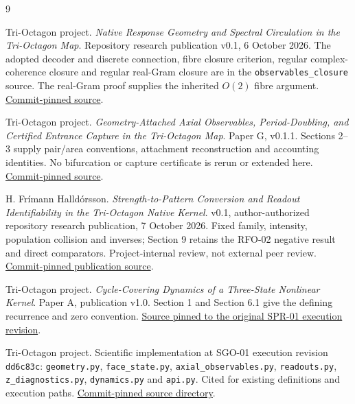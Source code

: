 \documentclass[11pt,a4paper]{article}
\begin{document}
\clearpage
\begin{thebibliography}{9}\raggedright
{}
Tri-Octagon project. \emph{Native Response Geometry and Spectral Circulation in the Tri-Octagon Map}. Repository research publication v0.1, 6 October 2026. The adopted decoder and discrete connection, fibre closure criterion, regular complex-coherence closure and regular real-Gram closure are in the \texttt{observables\_closure} source. The real-Gram proof supplies the inherited $O(2)$ fibre argument. \href{https://github.com/pzychozen/trioctagon-physics/blob/dd6c83cbf5bab228ea4fa4c2b90384d8b70f9772/papers/NATIVE_RESPONSE_GEOMETRY/manuscript/observables_closure.tex}{Commit-pinned source}.

Tri-Octagon project. \emph{Geometry-Attached Axial Observables, Period-Doubling, and Certified Entrance Capture in the Tri-Octagon Map}. Paper G, v0.1.1. Sections 2--3 supply pair/area conventions, attachment reconstruction and accounting identities. No bifurcation or capture certificate is rerun or extended here. \href{https://github.com/pzychozen/trioctagon-physics/blob/dd6c83cbf5bab228ea4fa4c2b90384d8b70f9772/papers/PAPER_G/v0.1.1/source/paper_g.tex}{Commit-pinned source}.

H. Fr\'imann Halld\'orsson. \emph{Strength-to-Pattern Conversion and Readout Identifiability in the Tri-Octagon Native Kernel}. v0.1, author-authorized repository research publication, 7 October 2026. Fixed family, intensity, population collision and inverses; Section 9 retains the RFO-02 negative result and direct comparators. Project-internal review, not external peer review. \href{https://github.com/pzychozen/trioctagon-physics/blob/dd6c83cbf5bab228ea4fa4c2b90384d8b70f9772/papers/STRENGTH_PATTERN_IDENTIFIABILITY/v0.1/source/SPR01_STRENGTH_PATTERN_IDENTIFIABILITY_v0.1.tex}{Commit-pinned publication source}.

Tri-Octagon project. \emph{Cycle-Covering Dynamics of a Three-State Nonlinear Kernel}. Paper A, publication v1.0. Section 1 and Section 6.1 give the defining recurrence and zero convention. \href{https://github.com/pzychozen/trioctagon-physics/blob/6794a72e934a5383547c2507d8c4891346cddf7a/papers/PAPER_A/publication/paper_A_publication.md}{Source pinned to the original SPR-01 execution revision}.

Tri-Octagon project. Scientific implementation at SGO-01 execution revision \texttt{dd6c83c}: \texttt{geometry.py}, \texttt{face\_state.py}, \texttt{axial\_observables.py}, \texttt{readouts.py}, \texttt{z\_diagnostics.py}, \texttt{dynamics.py} and \texttt{api.py}. Cited for existing definitions and execution paths. \href{https://github.com/pzychozen/trioctagon-physics/tree/dd6c83cbf5bab228ea4fa4c2b90384d8b70f9772/kernel_physics}{Commit-pinned source directory}.


\end{thebibliography}
\end{document}
